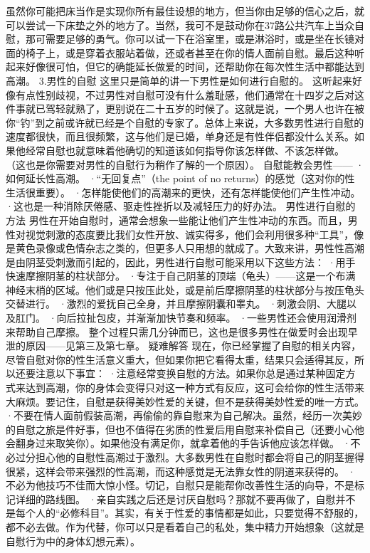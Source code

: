 \documentclass[12pt,UTF8]{ctexbook}
\begin{document}
虽然你可能把床当作是实现你所有最佳设想的地方，但当你由足够的信心之后，就可以尝试一下床垫之外的地方了。当然，我可不是鼓动你在37路公共汽车上当众自慰，那可需要足够的勇气。你可以试一下在浴室里，或是淋浴时，或是坐在长镜对面的椅子上，或是穿着衣服站着做，还或者甚至在你的情人面前自慰。最后这种听起来好像很可怕，但它的确能延长做爱的时间，还帮助你在每次性生活中都能达到高潮。
3.男性的自慰
这里只是简单的讲一下男性是如何进行自慰的。
这听起来好像有点性别歧视，不过男性对自慰可没有什么羞耻感，他们通常在十四岁之后对这件事就已驾轻就熟了，更别说在二十五岁的时候了。这就是说，一个男人也许在被你“钓”到之前或许就已经是个自慰的专家了。总体上来说，大多数男性进行自慰的速度都很快，而且很频繁，这与他们是已婚，单身还是有性伴侣都没什么关系。如果他经常自慰也就意味着他确切的知道该如何指导你该怎样做、不该怎样做。
（这也是你需要对男性的自慰行为稍作了解的一个原因）。
自慰能教会男性——
·如何延长性高潮。
·“无回复点”（the point of no returns）的感觉（这对你的性生活很重要）。
·怎样能使他们的高潮来的更快，还有怎样能使他们产生性冲动。
·这也是一种消除厌倦感、驱走性挫折以及减轻压力的好办法。
男性进行自慰的方法
男性在开始自慰时，通常会想象一些能让他们产生性冲动的东西。而且，男性对视觉刺激的态度要比我们女性开放、诚实得多，他们会利用很多种“工具”，像是黄色录像或色情杂志之类的，但更多人只用想的就成了。大致来讲，男性性高潮是由阴茎受刺激而引起的，因此，男性进行自慰可能采用以下这些方法：
·用手快速摩擦阴茎的柱状部分。
·专注于自己阴茎的顶端（龟头）——这是一个布满神经末梢的区域。他们或是只按压此处，或是前后摩擦阴茎的柱状部分与按压龟头交替进行。
·激烈的爱抚自己全身，并且摩擦阴囊和睾丸。
·刺激会阴、大腿以及肛门。
·向后拉扯包皮，并渐渐加快节奏和频率。
·一些男性还会使用润滑剂来帮助自己摩擦。
整个过程只需几分钟而已，这也是很多男性在做爱时会出现早泄的原因——见第三及第七章。
疑难解答
现在，你已经掌握了自慰的相关内容，尽管自慰对你的性生活意义重大，但如果你把它看得太重，结果只会适得其反，所以还要注意以下事宜：
·注意经常变换自慰的方法。如果你总是通过某种固定方式来达到高潮，你的身体会变得只对这一种方式有反应，这可会给你的性生活带来大麻烦。要记住，自慰是获得美妙性爱的关键，但不是获得美妙性爱的唯一方式。
·不要在情人面前假装高潮，再偷偷的靠自慰来为自己解决。虽然，经历一次美妙的自慰之旅是件好事，但也不值得在劣质的性爱后用自慰来补偿自己（还要小心他会翻身过来取笑你）。如果他没有满足你，就拿着他的手告诉他应该怎样做。
·不必过分担心他的自慰性高潮过于激烈。大多数男性在自慰时都会将自己的阴茎握得很紧，这样会带来强烈的性高潮，而这种感觉是无法靠女性的阴道来获得的。
·不必为他技巧不佳而大惊小怪。切记，自慰只是能帮你改善性生活的向导，不是标记详细的路线图。
·亲自实践之后还是讨厌自慰吗？那就不要再做了，自慰并不是每个人的“必修科目”。其实，有关于性爱的事情都是如此，只要觉得不舒服的，都不必去做。作为代替，你可以只是看着自己的私处，集中精力开始想象（这就是自慰行为中的身体幻想元素）。
\end{document}

